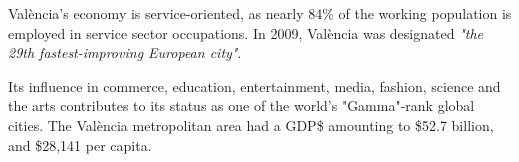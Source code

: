 \documentclass{article}
\begin{document}

València's economy is service-oriented, as nearly 84\% of the working population
is employed in service sector occupations. In 2009, València was designated \textit{"the
29th fastest-improving European city"}.  

Its influence in commerce, education, entertainment, media, fashion, science
and the arts contributes to its status as one of the world's "Gamma"-rank
global cities. The València metropolitan area had a GDP\$ amounting to \$52.7
billion, and \$28,141 per capita.
\end{document}
